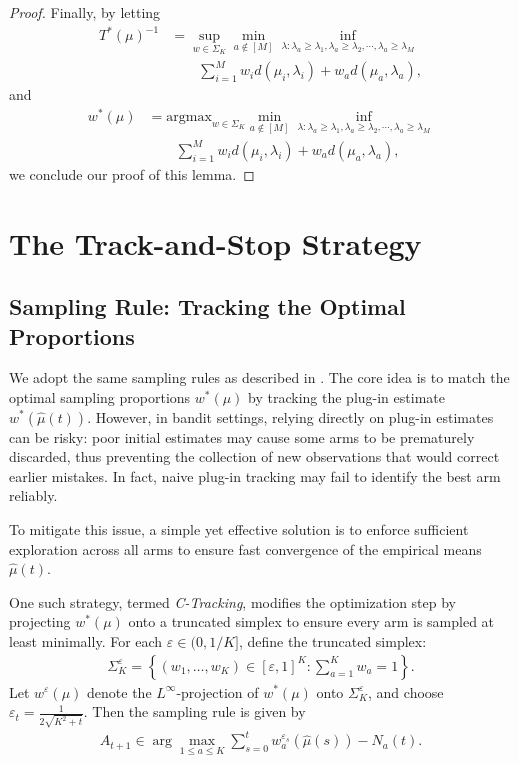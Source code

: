 \documentclass[final]{IEEEtran}
\newcommand{\nn}{\nonumber}
\begin{document}
\begin{proof}
Finally, by letting
\begin{align}
T^*(\mu)^{-1}&= \sup_{w \in \Sigma_K}\min_{a \notin [M]} \inf_{\lambda: \lambda_a\geq \lambda_1, \lambda_a \geq \lambda_2, \cdots, \lambda_a \geq \lambda_M}\nn\\
&\qquad  \sum_{i=1}^M w_i d(\mu_i,\lambda_i)+ w_a d(\mu_a,\lambda_a),
\end{align}
and
\begin{align}
w^*(\mu)&=\text{argmax}_{w \in \Sigma_K}  \min_{a \notin [M]} \inf_{\lambda: \lambda_a\geq \lambda_1, \lambda_a \geq \lambda_2, \cdots, \lambda_a \geq \lambda_M} \nn\\
&\qquad  \sum_{i=1}^M w_i d(\mu_i,\lambda_i)+ w_a d(\mu_a,\lambda_a),
\end{align} we conclude our proof of this lemma. 
\end{proof}
\section{The Track-and-Stop Strategy} \label{sec:achieve}
\subsection{Sampling Rule: Tracking the Optimal Proportions}
We adopt the same sampling rules as described in \cite[Section 3]{garivier2016optimal}. The core idea is to match the optimal sampling proportions $w^*(\mu)$ by tracking the plug-in estimate $ w^*(\hat{\mu}(t))$. However, in bandit settings, relying directly on plug-in estimates can be risky: poor initial estimates may cause some arms to be prematurely discarded, thus preventing the collection of new observations that would correct earlier mistakes. In fact, naive plug-in tracking may fail to identify the best arm reliably.

To mitigate this issue, a simple yet effective solution is to enforce sufficient exploration across all arms to ensure fast convergence of the empirical means $\hat{\mu}(t)$. 

One such strategy, termed \emph{C-Tracking}, modifies the optimization step by projecting \( w^*(\mu) \) onto a truncated simplex to ensure every arm is sampled at least minimally. For each $ \varepsilon \in (0, 1/K]$, define the truncated simplex:
\begin{align}
\Sigma_K^{\varepsilon} = \left\{ (w_1, \dots, w_K) \in [\varepsilon, 1]^K : \sum_{a=1}^K w_a = 1 \right\}.
\end{align}
Let $w^\varepsilon(\mu)$ denote the $ L^\infty $-projection of $ w^*(\mu) $ onto $ \Sigma_K^{\varepsilon}$, and choose $\varepsilon_t = \frac{1}{2\sqrt{K^2 + t}}$. Then the sampling rule is given by
\begin{align}
A_{t+1} \in \arg\max_{1 \leq a \leq K} \sum_{s=0}^{t} w_a^{\varepsilon_s}(\hat{\mu}(s)) - N_a(t).
\end{align}
\end{document}
